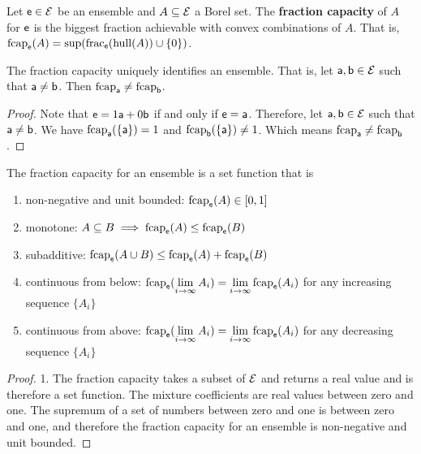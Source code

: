 \begin{mathSection}
	\begin{defn}
		Let $\ens \in \Ens$ be an ensemble and $A \subseteq \Ens$ a Borel set. The \textbf{fraction capacity} of $A$ for $\ens$ is the biggest fraction achievable with convex combinations of $A$. That is, $\fcap_{\ens}(A) = \sup(\size_{\ens}(\hull(A))\cup\{0\})$.
	\end{defn}
	
	\begin{coro}
		The fraction capacity uniquely identifies an ensemble. That is, let $\ens[a], \ens[b] \in \Ens$ such that $\ens[a] \neq \ens[b]$. Then $\fcap_{\ens[a]} \neq \fcap_{\ens[b]}$.
	\end{coro}
	
	\begin{proof}
		Note that $\ens = 1 \ens[a] + 0 \ens[b]$ if and only if $\ens = \ens[a]$. Therefore, let $\ens[a], \ens[b] \in \Ens$ such that $\ens[a] \neq \ens[b]$. We have $\fcap_{\ens[a]}(\{\ens[a]\}) = 1$ and $\fcap_{\ens[b]}(\{\ens[a]\}) \neq 1$. Which means $\fcap_{\ens[a]} \neq \fcap_{\ens[b]}$.
	\end{proof}
	
	\begin{prop}
		The fraction capacity for an ensemble is a set function that is
		\begin{enumerate}
			\item non-negative and unit bounded: $\fcap_{\ens}(A) \in [0,1]$
			\item monotone: $A \subseteq B \implies \fcap_{\ens}(A) \leq \fcap_{\ens}(B)$
			\item subadditive: $\fcap_{\ens}(A \cup B) \leq \fcap_{\ens}(A) + \fcap_{\ens}(B)$
			\item continuous from below: $\fcap_{\ens}(\lim\limits_{i \to \infty} A_i) = \lim\limits_{i \to \infty} \fcap_{\ens}(A_i)$ for any increasing sequence $\{A_i\}$
			\item continuous from above: $\fcap_{\ens}(\lim\limits_{i \to \infty} A_i) = \lim\limits_{i \to \infty} \fcap_{\ens}(A_i)$ for any decreasing sequence $\{A_i\}$
		\end{enumerate}
	\end{prop}
	
	\begin{proof}
		1. The fraction capacity takes a subset of $\Ens$ and returns a real value and is therefore a set function. The mixture coefficients are real values between zero and one. The supremum of a set of numbers between zero and one is between zero and one, and therefore the fraction capacity for an ensemble is non-negative and unit bounded.
		

\end{proof}
\end{mathSection}
